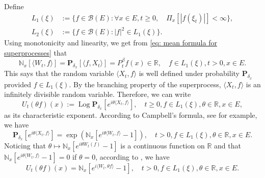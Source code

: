     Define
\begin{align}
    L_1(\xi)
    &:= \{f\in \mathcal B(E): \forall x\in E, t\geq 0, \quad \Pi_x[|f(\xi_t)|]< \infty\},
    \\L_2(\xi)
    &:= \{f \in \mathcal B(E): |f|^2 \in L_1(\xi)\}.
\end{align}
    Using monotonicity and linearity, we get from \eqref{eq: mean formula for superprocesses}  that
\begin{equation}
   \mathbb N_x[\langle W_t, f\rangle]   
    =\mathbf P_{\delta_x}[\langle f, X_t\rangle]
    =P^{\beta}_t f(x) \in \mathbb R,
    \quad f\in L_1(\xi), t > 0,x\in E.
\end{equation}
    This says that the random variable $\langle X_t, f\rangle$ is well defined under probability $\mathbf P_{\delta_x}$ provided $f\in L_1(\xi)$.
    By the branching property of the superprocess, $\langle X_t, f\rangle$ is an infinitely divisible random variable.
    Therefore, we can write
\[
    U_t(\theta f)(x) := \operatorname{Log} \mathbf P_{\delta_x}[e^{i \theta \langle X_t, f\rangle}],
    \quad t\geq 0, f\in L_1(\xi), \theta \in \mathbb R, x\in E,
\]
    as its characteristic exponent.
    According to Campbell's formula, see \cite[Theorem 2.7]{Kyprianou2014Fluctuations} for example, we have
\[
    \mathbf P_{\delta_x} [e^{i\theta \langle X_t, f\rangle}]
    = \exp(\mathbb N_x[ e^{i\theta \langle W_t, f\rangle} - 1]),
    \quad t>0, f\in L_1(\xi), \theta \in \mathbb R, x\in E.
\]
    Noticing that $\theta \mapsto \mathbb N_x[e^{i\theta W_t(f)} - 1]$ is a continuous function on $\mathbb R$ and that $\mathbb N_x[e^{i\theta \langle W_t, f\rangle} - 1] = 0$ if $\theta = 0$, according to \cite[Lemma 7.6]{Sato2013Levy}, we have
\begin{equation}
\label{eq: N and characteristic exponent}
    U_t(\theta f)(x) = \mathbb N_x[e^{i \langle W_t, \theta f\rangle} - 1],
    \quad t>0, f\in L_1(\xi), \theta \in \mathbb R, x\in E.
\end{equation}

